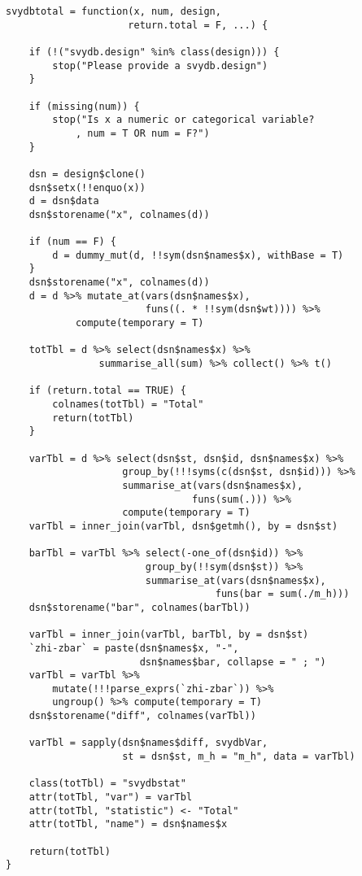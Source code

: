 \begin{lstlisting}
svydbtotal = function(x, num, design, 
                     return.total = F, ...) {

    if (!("svydb.design" %in% class(design))) {
        stop("Please provide a svydb.design")
    }

    if (missing(num)) {
        stop("Is x a numeric or categorical variable?
            , num = T OR num = F?")
    }

    dsn = design$clone()
    dsn$setx(!!enquo(x))
    d = dsn$data
    dsn$storename("x", colnames(d))

    if (num == F) {
        d = dummy_mut(d, !!sym(dsn$names$x), withBase = T)
    }
    dsn$storename("x", colnames(d))
    d = d %>% mutate_at(vars(dsn$names$x), 
                        funs((. * !!sym(dsn$wt)))) %>% 
            compute(temporary = T)

    totTbl = d %>% select(dsn$names$x) %>% 
                summarise_all(sum) %>% collect() %>% t()

    if (return.total == TRUE) {
        colnames(totTbl) = "Total"
        return(totTbl)
    }

    varTbl = d %>% select(dsn$st, dsn$id, dsn$names$x) %>% 
                    group_by(!!!syms(c(dsn$st, dsn$id))) %>% 
                    summarise_at(vars(dsn$names$x),
                                funs(sum(.))) %>% 
                    compute(temporary = T)
    varTbl = inner_join(varTbl, dsn$getmh(), by = dsn$st)

    barTbl = varTbl %>% select(-one_of(dsn$id)) %>% 
                        group_by(!!sym(dsn$st)) %>% 
                        summarise_at(vars(dsn$names$x), 
                                    funs(bar = sum(./m_h)))
    dsn$storename("bar", colnames(barTbl))

    varTbl = inner_join(varTbl, barTbl, by = dsn$st)
    `zhi-zbar` = paste(dsn$names$x, "-", 
                       dsn$names$bar, collapse = " ; ")
    varTbl = varTbl %>% 
        mutate(!!!parse_exprs(`zhi-zbar`)) %>% 
        ungroup() %>% compute(temporary = T)
    dsn$storename("diff", colnames(varTbl))

    varTbl = sapply(dsn$names$diff, svydbVar, 
                    st = dsn$st, m_h = "m_h", data = varTbl)

    class(totTbl) = "svydbstat"
    attr(totTbl, "var") = varTbl
    attr(totTbl, "statistic") <- "Total"
    attr(totTbl, "name") = dsn$names$x

    return(totTbl)
}
\end{lstlisting}

